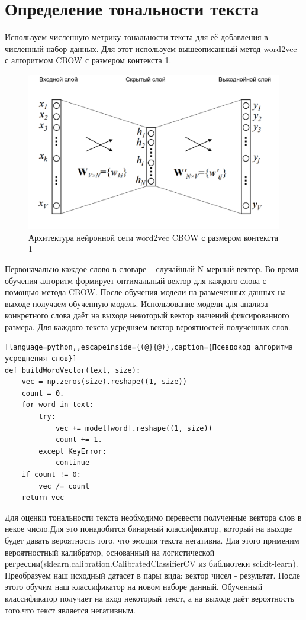 \section{Определение тональности текста}
Используем численную метрику тональности текста для её добавления в численный набор данных. Для этот используем вышеописанный метод word2vec с алгоритмом CBOW с размером контекста 1.
\begin{figure}[!h]
	\centering
	\includegraphics[scale=0.4]{master_img/cbow_model2_edited.png}
	\caption{Архитектура нейронной сети word2vec CBOW с размером контекста 1}
	\label{fig09}
\end{figure}
 Первоначально каждое слово в словаре – случайный N-мерный вектор. Во время обучения алгоритм формирует оптимальный вектор для каждого слова с помощью метода CBOW. После обучения модели на размеченных данных на выходе получаем обученную модель. Использование модели для анализа конкретного слова даёт на выходе некоторый вектор значений фиксированного размера.
 Для каждого текста усредняем вектор вероятностей полученных слов.
 \begin{lstlisting}[language=python,,escapeinside={(@}{@)},caption={Псевдокод алгоритма усреднения слов}] 
def buildWordVector(text, size):
	vec = np.zeros(size).reshape((1, size))
	count = 0.
	for word in text:
		try:
			vec += model[word].reshape((1, size))
			count += 1.
	 	except KeyError:
			continue
	if count != 0:
		vec /= count
	return vec

 \end{lstlisting}

Для оценки тональности текста необходимо перевести полученные вектора слов в некое число.Для это понадобится бинарный классификатор, который на выходе будет давать вероятность того, что эмоция текста негативна.
Для этого применим вероятностный калибратор, основанный на логистической регрессии(sklearn.calibration.CalibratedClassifierCV из библиотеки scikit-learn).
Преобразуем наш исходный датасет в пары вида: вектор чисел - результат.
После этого обучим наш классификатор на новом наборе данный.
Обученный классификатор получает на вход некоторый текст, а на выходе даёт вероятность того,что текст является негативным.

